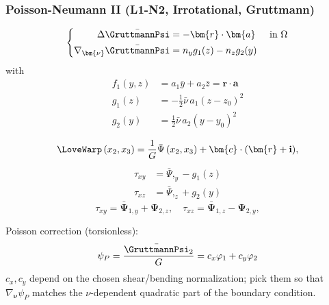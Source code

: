 \subsubsection{Poisson-Neumann II (L1-N2,  Irrotational, Gruttmann)}
\begin{equation}
\left\{
\begin{aligned}
\Delta \bar{\GruttmannPsi}&=-\bm{r}\cdot{\bm{a}} & \text { in } \Omega \\
\nabla_{\bm{\nu}}\bar{\GruttmannPsi}&=n_y g_1(z)-n_z g_2(y)
\end{aligned}
\right.
\end{equation}
with
\begin{equation*}
\begin{aligned}
f_1(y, z)&=a_1 \bar{y}+a_2 \bar{z} = \bm{r}\cdot\bm{a} \\
g_1(z)&=-\frac{1}{2} \bar{\nu}\, a_1\left(z-z_0\right)^2 \\
g_2(y)&=\frac{1}{2} \bar{\nu}\, a_2\left(y-y_0\right)^2
\end{aligned}
\end{equation*}

\begin{equation*}
\LoveWarp\left(x_2, x_3\right)=\frac{1}{G} \bar{\Psi}\left(x_2, x_3\right)+\bm{c} \cdot (\bm{r} + \mathbf{i}),
\end{equation*}
\begin{equation}
\begin{aligned}
\tau_{x y} &=\bar{\Psi},_y-g_1(z) \\
\tau_{x z} &=\bar{\Psi},_z+g_2(y)
\end{aligned}
\end{equation}
\begin{equation}
\tau_{x y}=\bar{\mathbf{\Psi}}_{1, y}+\mathbf{\Psi}_{2, z}, 
\quad \tau_{x z}=\bar{\mathbf{\Psi}}_{1, z}-\mathbf{\Psi}_{2, y},
\end{equation}

Poisson correction (torsionless): \[
\psi_P=\frac{\bar{\GruttmannPsi}_2}{G}
=c_x \varphi_1+c_y \varphi_2
\]
$c_x, c_y$ depend on the chosen shear/bending normalization; pick them so that $\nabla_{\bm{\nu}} \psi_P$ matches the \(\nu\)-dependent quadratic part of the boundary condition.


